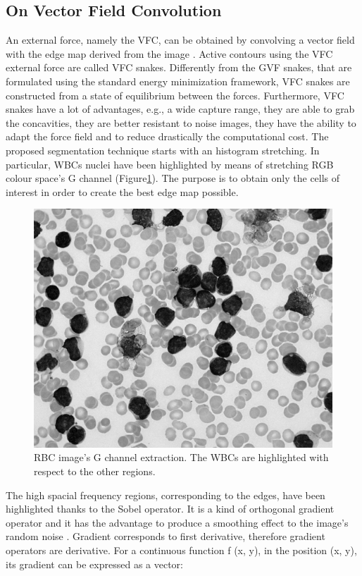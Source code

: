 \documentclass[final,a4paper,12pt,english]{UnicaPhdThesis3}
\begin{document}
	\subsection{On Vector Field Convolution}
	An external force, namely the VFC, can be obtained by convolving a vector field with the edge map derived from the image \cite{Bing}. 
	Active contours using the VFC external force are called VFC snakes. Differently from the GVF \cite{Xu} snakes, that are formulated using the standard energy minimization framework, VFC snakes are constructed from a state of equilibrium between the forces. Furthermore, VFC snakes have a lot of advantages, e.g., a wide capture range, they are able to grab the concavities, they are better resistant to noise images, they have the ability to adapt the force field and to reduce drastically the computational cost.
	The proposed segmentation technique starts with an histogram stretching. In particular, WBCs nuclei have been highlighted by means of stretching RGB colour space's G channel (Figure\ref{fig:GreenComp}).
	The purpose is to obtain only the cells of interest in order to create the best edge map possible.
	
	\begin{figure}[!b]
		\begin{center}
			\centering
			\includegraphics[scale=0.3]{images/2018_1_visapp/GreenComp.png}
			\caption{RBC image's G channel extraction. The WBCs are highlighted with respect to the other regions.}
			\label{fig:GreenComp}
		\end{center}
	\end{figure}
	The high spacial frequency regions, corresponding to the edges, have been highlighted thanks to the Sobel operator. It is a kind of orthogonal gradient operator and it has the advantage to produce a smoothing effect to the image's random noise \cite{Sobel}. Gradient corresponds to first derivative, therefore gradient operators are derivative. For a continuous function f
	(x, y), in the position (x, y), its gradient can be expressed as a vector:
	\medskip
	
\end{document}
